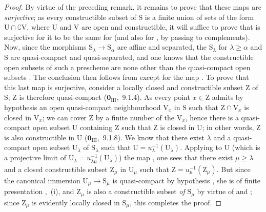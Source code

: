 \begin{proof}
By virtue of the preceding remark, it remains to prove that these maps are \emph{surjective}; as every constructible subset of $\mathrm{S}$ is a finite union of sets of the form $\mathrm{U}\cap\complement\mathrm{V}$, where $\mathrm{U}$ and $\mathrm{V}$ are open and constructible, it will suffice to prove that  is surjective for it to be the same for  (and also for , by passing to complements).
Now, since the morphisms $\mathrm{S}_\lambda\to\mathrm{S}_\alpha$ are affine and separated, the $\mathrm{S}_\lambda$ for $\lambda\geqslant\alpha$ and $\mathrm{S}$ are quasi-compact and quasi-separated, and one knows that the constructible open subsets of such a prescheme are none other than the quasi-compact open subsets .
The conclusion then follows from  except for the map .
To prove that this last map is surjective, consider a locally closed and constructible subset $\mathrm{Z}$ of $\mathrm{S}$; $\mathrm{Z}$ is therefore quasi-compact ($\mathbf{0}_{\mathrm{III}}$,~9.1.4).
As every point $x\in\mathrm{Z}$ admits by hypothesis an open quasi-compact neighbourhood $\mathrm{V}_x$ in $\mathrm{S}$ such that $\mathrm{Z}\cap\mathrm{V}_x$ is closed in $\mathrm{V}_x$; we can cover $\mathrm{Z}$ by a finite number of the $\mathrm{V}_x$, hence there is a quasi-compact open subset $\mathrm{U}$ containing $\mathrm{Z}$ such that $\mathrm{Z}$ is closed in $\mathrm{U}$; in other words, $\mathrm{Z}$ is also constructible in $\mathrm{U}$ ($\mathbf{0}_{\mathrm{III}}$,~9.1.8).
We know  that there exist $\lambda$ and a quasi-compact open subset $\mathrm{U}_\lambda$ of $\mathrm{S}_\lambda$ such that $\mathrm{U}=u_\lambda^{-1}(\mathrm{U}_\lambda)$.
Applying to $\mathrm{U}$ (which is a projective limit of $\mathrm{U}_\lambda=u_{\lambda\mu}^{-1}(\mathrm{U}_\lambda)$) the map , one sees that there exist $\mu\geqslant\lambda$ and a closed constructible subset $\mathrm{Z}_\mu$ in $\mathrm{U}_\mu$ such that $\mathrm{Z}=u_\mu^{-1}(\mathrm{Z}_\mu)$.
But since the canonical immersion $\mathrm{U}_\mu\to\mathrm{S}_\mu$ is quasi-compact by hypothesis , she is of finite presentation ,~(i), and $\mathrm{Z}_\mu$ is also a constructible subset \emph{of} $\mathrm{S}_\mu$ by virtue of  and ; since $\mathrm{Z}_\mu$ is evidently locally closed in $\mathrm{S}_\mu$, this completes the proof.
\end{proof}


